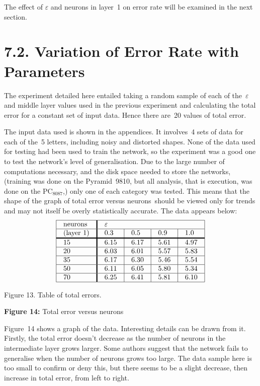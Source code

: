 \documentclass[12pt]{report}
\begin{document}
The effect of $\varepsilon$ and neurons in layer~1 on error rate will
be examined in the next section.

\section{7.2. Variation of Error Rate with Parameters}

The experiment detailed here entailed taking a random sample of each
of the~$\varepsilon$ and middle layer values used in the previous
experiment and calculating the total error for a constant set of
input data.
Hence there are~20 values of total error.

The input data used is shown in the appendices.
It involves~4 sets of data for each of the~5 letters, including
noisy and distorted shapes.
None of the data used for testing had been used to train the network,
so the experiment was a good one to test the network's level of
generalisation.
Due to the large number of computations necessary, and the disk
space needed to store the networks, (training was done on the
Pyramid~9810, but all analysis, that is execution, was done on the
PC$_{8087}$,) only one of each category was tested.
This means that the shape of the graph of total error versus neurons\
should be viewed only for trends and may not itself be overly
statistically accurate.
The data appears below:
$$
\vbox{\tabskip=0pt \offinterlineskip

\halign{\strut#& \vrule#\tabskip=1em plus2em&
 #& \vrule width1.5pt#&
 #& \vrule#&
 #& \vrule#&
 #& \vrule#&
 #& \vrule#\tabskip=0pt\cr
\hline
&&{neurons}&&\multispan{7}$\varepsilon$&\cr
\hline
&&{(layer 1)}&& 0.3&& 0.5&&
  0.9&& 1.0&\cr
\noalign{\hrule height1.5pt}
&&15&&6.15&&6.17&&5.61&&4.97&\cr
\hline
&&20&&6.03&&6.01&&5.57&&5.83&\cr
\hline
&&35&&6.17&&6.30&&5.46&&5.54&\cr
\hline
&&50&&6.11&&6.05&&5.80&&5.34&\cr
\hline
&&70&&6.25&&6.41&&5.81&&6.10&\cr
\hline
}}
$$
{Figure 13. Table of total errors.}

\par\textbf{Figure 14:} Total error versus neurons

Figure~14 shows a graph of the data.
Interesting details can be drawn from it.
Firstly, the total error doesn't decrease as the number of neurons in
the intermediate layer grows larger.
Some authors suggest that the network fails to generalise when the
number of neurons grows too large.
The data sample here is too small to confirm or deny this, but there
seems to be a slight decrease, then increase in total error,
from left to right.
\end{document}
